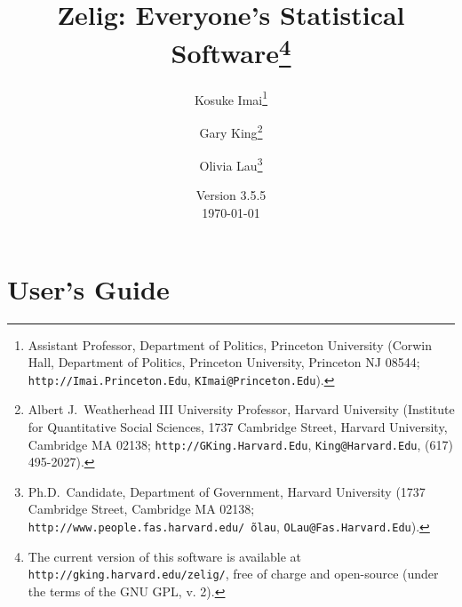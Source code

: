 
\usepackage{Sweave}

\title{Zelig: Everyone's Statistical Software\thanks{The current
    version of this software is available at
    \texttt{http://gking.harvard.edu/zelig/}, free of charge and
    open-source (under the terms of the GNU GPL, v. 2).}}
\author{Kosuke
  Imai\thanks{Assistant Professor, Department of Politics, Princeton
    University (Corwin Hall, Department of Politics, Princeton
    University, Princeton NJ 08544; \texttt{http://Imai.Princeton.Edu},
    \texttt{KImai@Princeton.Edu}).}
\and %
Gary King\thanks{Albert J.\ Weatherhead III University Professor, Harvard
  University (Institute for Quantitative Social Sciences, 1737 Cambridge 
Street, Harvard University, Cambridge MA 02138;
  \texttt{http://GKing.Harvard.Edu}, \texttt{King@Harvard.Edu}, (617)
  495-2027).}
\and %
Olivia Lau\thanks{Ph.D.\ Candidate, Department of Government, Harvard
  University (1737 Cambridge Street, Cambridge MA 02138;
  \texttt{http://www.people.fas.harvard.edu/\~\,olau},
  \texttt{OLau@Fas.Harvard.Edu}).}}

\date{Version 3.5.5 \\ \today}







\maketitle


\tableofcontents

\nobibliography*





\part[User's Guide]{User's Guide}






